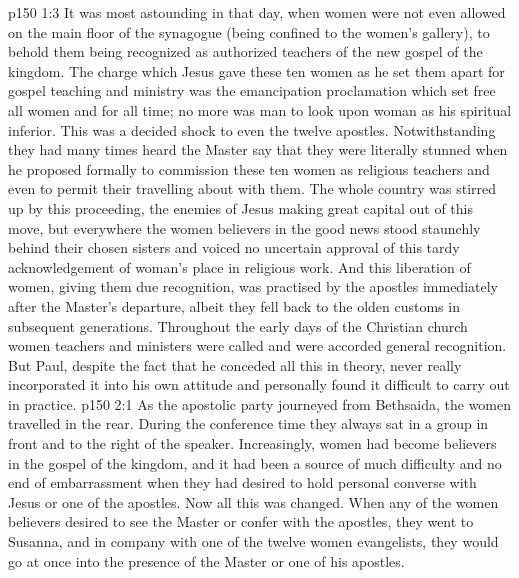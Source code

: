 \vs p150 1:3 It was most astounding in that day, when women were not even allowed on the main floor of the synagogue (being confined to the women’s gallery), to behold them being recognized as authorized teachers of the new gospel of the kingdom. The charge which Jesus gave these ten women as he set them apart for gospel teaching and ministry was the emancipation proclamation which set free all women and for all time; no more was man to look upon woman as his spiritual inferior. This was a decided shock to even the twelve apostles. Notwithstanding they had many times heard the Master say that  they were literally stunned when he proposed formally to commission these ten women as religious teachers and even to permit their travelling about with them. The whole country was stirred up by this proceeding, the enemies of Jesus making great capital out of this move, but everywhere the women believers in the good news stood staunchly behind their chosen sisters and voiced no uncertain approval of this tardy acknowledgement of woman’s place in religious work. And this liberation of women, giving them due recognition, was practised by the apostles immediately after the Master’s departure, albeit they fell back to the olden customs in subsequent generations. Throughout the early days of the Christian church women teachers and ministers were called  and were accorded general recognition. But Paul, despite the fact that he conceded all this in theory, never really incorporated it into his own attitude and personally found it difficult to carry out in practice.
\vs p150 2:1 As the apostolic party journeyed from Bethsaida, the women travelled in the rear. During the conference time they always sat in a group in front and to the right of the speaker. Increasingly, women had become believers in the gospel of the kingdom, and it had been a source of much difficulty and no end of embarrassment when they had desired to hold personal converse with Jesus or one of the apostles. Now all this was changed. When any of the women believers desired to see the Master or confer with the apostles, they went to Susanna, and in company with one of the twelve women evangelists, they would go at once into the presence of the Master or one of his apostles.
